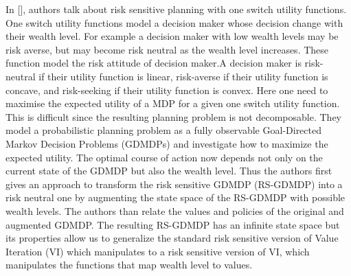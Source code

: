 \documentclass[10pt,a4paper,oneside]{report}
\begin{document}
In [], authors talk about risk sensitive planning with one switch utility functions. One switch utility functions model a decision maker whose decision change with their wealth level. For example a decision maker with low wealth levels may be risk averse, but may become risk neutral as the wealth level increases. These function model the risk attitude of decision maker.A decision maker is risk-neutral if their utility function is linear, risk-averse if their utility function is concave, and risk-seeking if their utility function is convex. Here one need to maximise the expected utility of a MDP for a given one switch utility function. This is difficult since the resulting planning problem is not decomposable. They model a probabilistic planning problem as a fully observable Goal-Directed Markov Decision Problems (GDMDPs) and investigate how to maximize the expected utility. The optimal course of action now depends not only on the current state of the GDMDP but also the wealth level. Thus the authors first gives an approach to transform the risk sensitive GDMDP (RS-GDMDP) into a risk neutral one by augmenting the state space of the RS-GDMDP with possible wealth levels. The authors than relate the values and policies of the original and augmented GDMDP.  The resulting RS-GDMDP has an infinite state space but its properties allow us to generalize the standard risk sensitive version of Value Iteration (VI) which manipulates to a risk sensitive version of VI, which manipulates the functions that map wealth level to values.\\
\end{document}
